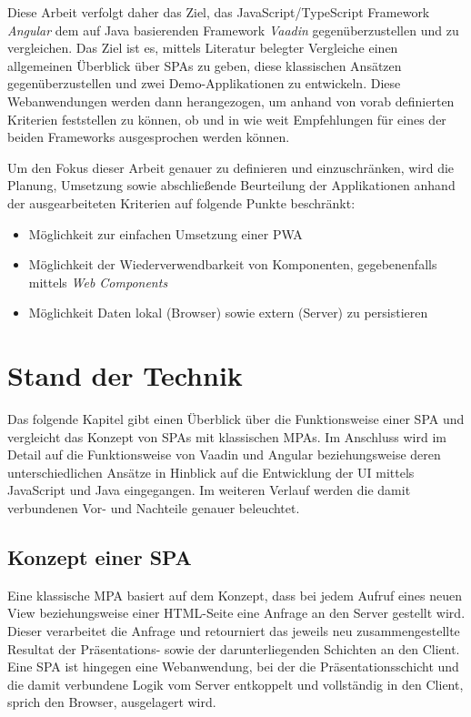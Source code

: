 \documentclass[a4paper,12pt,twoside]{scrreprt}
\begin{document}
\medskip

Diese Arbeit verfolgt daher das Ziel, das JavaScript/TypeScript Framework \textit{Angular} dem auf Java basierenden Framework \textit{Vaadin} gegenüberzustellen und zu vergleichen. Das Ziel ist es, mittels Literatur belegter Vergleiche einen allgemeinen Überblick über \acp{SPA} zu geben, diese klassischen Ansätzen gegenüberzustellen und zwei Demo-Applikationen zu entwickeln. Diese Webanwendungen werden dann herangezogen, um anhand von vorab definierten Kriterien feststellen zu können, ob und in wie weit Empfehlungen für eines der beiden Frameworks ausgesprochen werden können.

\medskip

Um den Fokus dieser Arbeit genauer zu definieren und einzuschränken, wird die Planung, Umsetzung sowie abschließende Beurteilung der Applikationen anhand der ausgearbeiteten Kriterien auf folgende Punkte beschränkt:
\begin{itemize}
    \item Möglichkeit zur einfachen Umsetzung einer \acf{PWA}
    \item Möglichkeit der Wiederverwendbarkeit von Komponenten, gegebenenfalls mittels \textit{Web Components}
    \item Möglichkeit Daten lokal (Browser) sowie extern (Server) zu persistieren
\end{itemize}

\chapter{Stand der Technik}
\label{chap:stand-technik}
Das folgende Kapitel gibt einen Überblick über die Funktionsweise einer \ac{SPA} und vergleicht das Konzept von \acsp{SPA} mit klassischen \acp{MPA}. Im Anschluss wird im Detail auf die Funktionsweise von Vaadin und Angular beziehungsweise deren unterschiedlichen Ansätze in Hinblick auf die Entwicklung der \acs{UI} mittels JavaScript und Java eingegangen. Im weiteren Verlauf werden die damit verbundenen Vor- und Nachteile genauer beleuchtet.

\section{Konzept einer \acs{SPA}}
\label{sec:konzept-spa}
Eine klassische \ac{MPA} basiert auf dem Konzept, dass bei jedem Aufruf eines neuen View beziehungsweise einer HTML-Seite eine Anfrage an den Server gestellt wird. Dieser verarbeitet die Anfrage und retourniert das jeweils neu zusammengestellte Resultat der Präsentations- sowie der darunterliegenden Schichten an den Client. Eine \ac{SPA} ist hingegen eine Webanwendung, bei der die Präsentationsschicht und die damit verbundene Logik vom Server entkoppelt und vollständig in den Client, sprich den Browser, ausgelagert wird. \parencite[][Seite 5ff.]{scott_spa_2015}
\end{document}
